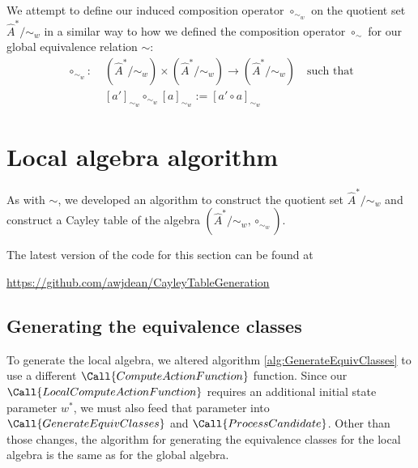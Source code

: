 We attempt to define our induced composition operator $\circ_{\sim_{w}}$ on the quotient set $\hat{A}^{*}/\sim_{w}$ in a similar way to how we defined the composition operator $\circ_{\sim}$ for our global equivalence relation $\sim$:
\begin{equation}
\begin{aligned}
    \circ_{\sim_{w}}: \; &(\hat{A}^{*}/\sim_{w}) \times (\hat{A}^{*}/\sim_{w}) \to (\hat{A}^{*}/\sim_{w}) \quad \text{such that}\\
    & [a']_{\sim_{w}} \circ_{\sim_{w}} [a]_{\sim_{w}} := [a' \circ a]_{\sim_{w}}
\end{aligned}
\end{equation}


\section{Local algebra algorithm}

As with $\sim$, we developed an algorithm to construct the quotient set $\hat{A}^{*}/\sim_{w}$ and construct a Cayley table of the algebra $(\hat{A}^{*}/\sim_{w}, \circ_{\sim_{w}})$.

The latest version of the code for this section can be found at
\begin{center}
\url{https://github.com/awjdean/CayleyTableGeneration}
\end{center}

\subsection{Generating the equivalence classes}

To generate the local algebra, we altered algorithm \ref{alg:GenerateEquivClasses} to use a different $\Call{ComputeActionFunction}$ function.
Since our $\Call{LocalComputeActionFunction}$ requires an additional initial state parameter $w^{*}$, we must also feed that parameter into $\Call{GenerateEquivClasses}$ and $\Call{ProcessCandidate}$.
Other than those changes, the algorithm for generating the equivalence classes for the local algebra is the same as for the global algebra.

